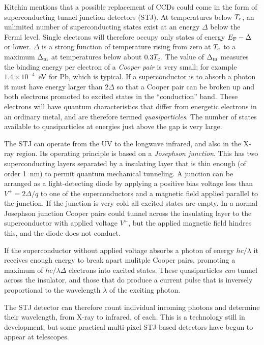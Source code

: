 Kitchin mentions that a possible replacement of CCDs could come in the form
of superconducting tunnel junction detectors (STJ). At temperatures
below $T_{\rm c}$, an unlimited number of superconducting states exist
at an energy $\Delta$ below the Fermi level. Single electrons will
therefore occupy only states of energy $E_{\rm F}-\Delta$ or
  lower. $\Delta$ is a strong function of temperature rising from zero
  at $T_{\rm c}$ to a maximum $\Delta_{\rm m}$ at temperatures below
  about $0.3T_{\rm c}$. The value of $\Delta_{\rm m}$ measures the
  binding energy per electron of a {\it Cooper pair} is very small;
  for example $1.4\times 10^{-4}$~eV for Pb, which is typical. If a
  superconductor is to absorb a photon it must have energy larger than
  $2\Delta$ so that a Cooper pair can be broken up and both electrons
  promoted to excited states in the ``conduction'' band. These
  electrons will have quantum characteristics that differ from
  energetic electrons in an ordinary metal, and are therefore termed
  {\it quasiparticles}. The number of states available to
  quasiparticles at energies just above the gap is very large.

The STJ can operate 
from the UV to the longwave infrared, and also in the X-ray region.
Its operating principle is based on a {\it Josephson junction}. This has two 
superconducting layers separated by a insulating layer that is thin
enough (of order 1~nm) to permit quantum mechanical tunneling. A
junction can be arranged as a light-detecting diode by applying a
positive bias voltage less than $V^{+}=2\Delta/q$ to one of the
superconductors and a magnetic field applied parallel to the
junction. If the junction is very cold all excited states are
empty. In a normal Josephson junction Cooper pairs could tunnel across
the insulating layer to the superconductor with applied voltage
$V^{+}$, but the applied magnetic field hindres this, and the diode
does not conduct.

If the superconductor without applied voltage absorbs a photon of
energy $hc/\lambda$ it receives enough energy to break apart mulitple
Cooper pairs, promoting a maximum of $hc/\lambda\Delta$ electrons into
excited states. These quasiparticles {\it can} tunnel across the
insulator, and those that do produce a current pulse that is inversely
proportional to the wavelength $\lambda$ of the exciting photon.

The STJ detector can therefore count individual incoming photons and
determine their wavelength, from X-ray to infrared, of each. This is a
technology still in development, but some practical multi-pixel
STJ-based detectors have begun to appear at telescopes.

